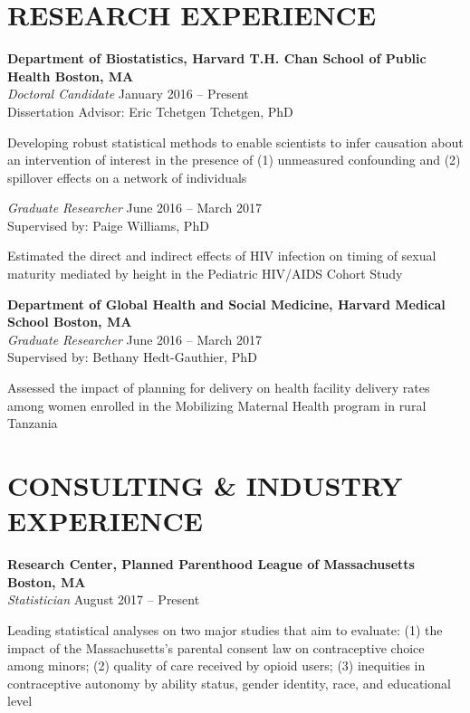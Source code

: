 \documentclass[12pt]{article}
\begin{document}
\section*{\textbf{{\large R}ESEARCH {\large E}XPERIENCE }}

\textbf{Department of Biostatistics, Harvard T.H. Chan School of Public Health \hfill \hfill Boston, MA} \\
\textit{Doctoral Candidate}  \hfill \hfill January 2016 -- Present \\
Dissertation Advisor: Eric Tchetgen Tchetgen, PhD 
\begin{addmargin}[1em]{2em} {\small Developing robust statistical methods to enable scientists to infer causation about an intervention of interest in the presence of (1) unmeasured confounding and (2) spillover effects on a network of individuals}  \end{addmargin} 
\vspace{.2cm}
\textit{Graduate Researcher} \hfill \hfill June 2016 -- March 2017 \\
Supervised by: Paige Williams, PhD
\begin{addmargin}[1em]{2em} {\small Estimated the direct and indirect effects of HIV infection on timing of sexual maturity mediated by height in the Pediatric HIV/AIDS Cohort Study} \end{addmargin} 
\vspace{.2cm}
\textbf{Department of Global Health and Social Medicine, Harvard Medical School \hfill \hfill Boston, MA} \\
\textit{Graduate Researcher} \hfill \hfill June 2016 -- March 2017 \\
Supervised by: Bethany Hedt-Gauthier, PhD
\begin{addmargin}[1em]{2em} {\small Assessed the impact of planning for delivery on health facility delivery rates among women enrolled in the Mobilizing Maternal Health program in rural Tanzania} \end{addmargin}


\section*{\textbf{{\large C}{ONSULTING} \& {\large I}{NDUSTRY} {\large E}{XPERIENCE}}}
\textbf{Research Center, Planned Parenthood League of Massachusetts \hfill \hfill Boston, MA}  \\
\textit{Statistician} \hfill \hfill August 2017 -- Present
\begin{addmargin}[1em]{2em} {\small Leading statistical analyses on two major studies that aim to evaluate: (1) the impact of the Massachusetts's parental consent law on contraceptive choice among minors; (2) quality of care received by opioid users; (3) inequities in contraceptive autonomy by ability status, gender identity, race, and educational level} \\ \end{addmargin} 
\end{document}
